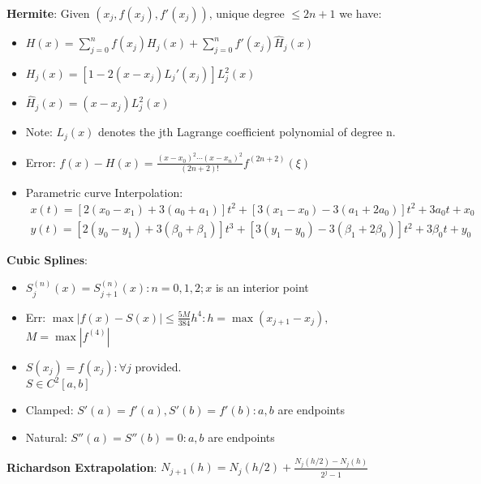 \documentclass{article}
\begin{document}
\begin{minipage}[t]{0.49\textwidth}
\textbf{Hermite}: Given $(x_j, f(x_j), f'(x_j))$, unique degree $\leq 2n+1$ we have:
  \begin{itemize}
\item $H(x) = \sum_{j=0}^n f(x_j)H_j(x) + \sum_{j=0}^n f'(x_j)\hat{H}_j(x)$
    \item $H_j(x)=[1-2(x-x_j)L_j'(x_j)]L_j^2(x)$
    \item $\hat{H}_j(x)=(x-x_j)L_j^2(x)$
    \item Note: $L_j(x)$ denotes the jth Lagrange coefficient polynomial of degree n. 
\item Error: $f(x)-H(x) = \frac{(x-x_0)^2\cdots(x-x_n)^2}{(2n+2)!}f^{(2n+2)}(\xi)$
\item Parametric curve Interpolation:
\begin{gather*}
    x(t)=[2(x_0-x_1)+3(a_0+a_1)]t^2+[3(x_1-x_0)-3(a_1+2a_0)]t^2+3a_0t+x_0\\
    y(t)=[2(y_0-y_1)+3(\beta_0+\beta_1)]t^3+[3(y_1-y_0)-3(\beta_1+2\beta_0)]t^2+3\beta_0t+y_0
    \end{gather*}
  \end{itemize}
  \textbf{Cubic Splines}:\\
  \begin{minipage}[t]{0.45\textwidth}
    \begin{itemize}
      \item{$S_j^{(n)}(x)=S_{j+1}^{(n)}(x): n=0,1,2; x$ is an interior point }
      \item{Err: $\max{|f(x)-S(x)|}\le \frac{5M}{384}h^4:h=\max(x_{j+1}-x_j),$\\$M=\max|f^{(4)}|$}
    \end{itemize}
  \end{minipage}
  \hfill
  \begin{minipage}[t]{0.45\textwidth}
    \begin{itemize}
      \item $S(x_j)=f(x_j):\forall j$ provided. \\$S\in C^2[a,b]$ 
      \item{Clamped: $S'(a)=f'(a), S'(b)=f'(b): a,b $ are endpoints }
      \item{Natural: $S''(a)=S''(b)=0:a,b$ are endpoints }
    \end{itemize}
  \end{minipage}

\textbf{Richardson Extrapolation}: $N_{j+1}(h) = N_j(h/2) + \frac{N_j(h/2) - N_j(h)}{2^{j}-1}$


\end{minipage}
\end{document}
